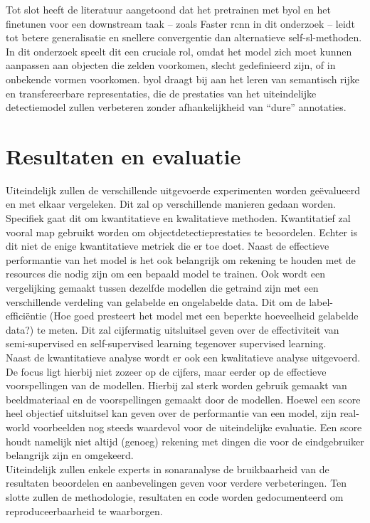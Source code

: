 Tot slot heeft de literatuur aangetoond dat het pretrainen met \gls{byol} en het finetunen voor een downstream taak -- zoals Faster \gls{rcnn} in dit onderzoek -- leidt tot betere generalisatie en snellere convergentie dan alternatieve \gls{self-sl}-methoden. In dit onderzoek speelt dit een cruciale rol, omdat het model zich moet kunnen aanpassen aan objecten die zelden voorkomen, slecht gedefinieerd zijn, of in onbekende vormen voorkomen. \gls{byol} draagt bij aan het leren van semantisch rijke en transfereerbare representaties, die de prestaties van het uiteindelijke detectiemodel zullen verbeteren zonder afhankelijkheid van ``dure'' annotaties.

\section{Resultaten en evaluatie}

Uiteindelijk zullen de verschillende uitgevoerde experimenten worden geëvalueerd en met elkaar vergeleken. Dit zal op verschillende manieren gedaan worden. Specifiek gaat dit om kwantitatieve en kwalitatieve methoden. Kwantitatief zal vooral \acrfull{map} gebruikt worden om objectdetectieprestaties te beoordelen. Echter is dit niet de enige kwantitatieve metriek die er toe doet. Naast de effectieve performantie van het model is het ook belangrijk om rekening te houden met de resources die nodig zijn om een bepaald model te trainen. Ook wordt een vergelijking gemaakt tussen dezelfde modellen die getraind zijn met een verschillende verdeling van gelabelde en ongelabelde data. Dit om de label-efficiëntie (Hoe goed presteert het model met een beperkte hoeveelheid gelabelde data?) te meten. Dit zal cijfermatig uitsluitsel geven over de effectiviteit van semi-supervised en self-supervised learning tegenover supervised learning. \\

Naast de kwantitatieve analyse wordt er ook een kwalitatieve analyse uitgevoerd. De focus ligt hierbij niet zozeer op de cijfers, maar eerder op de effectieve voorspellingen van de modellen. Hierbij zal sterk worden gebruik gemaakt van beeldmateriaal en de voorspellingen gemaakt door de modellen. Hoewel een score heel objectief uitsluitsel kan geven over de performantie van een model, zijn real-world voorbeelden nog steeds waardevol voor de uiteindelijke evaluatie. Een score houdt namelijk niet altijd (genoeg) rekening met dingen die voor de eindgebruiker belangrijk zijn en omgekeerd. \\

Uiteindelijk zullen enkele experts in sonaranalyse de bruikbaarheid van de resultaten beoordelen en aanbevelingen geven voor verdere verbeteringen. Ten slotte zullen de methodologie, resultaten en code worden gedocumenteerd om reproduceerbaarheid te waarborgen.
